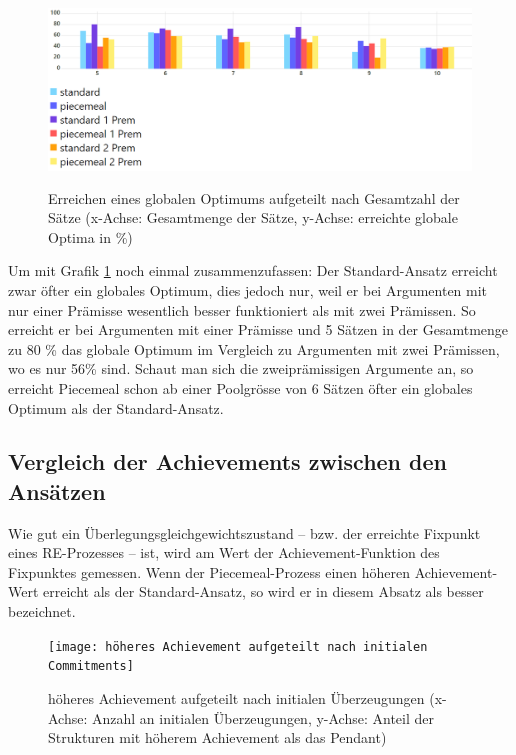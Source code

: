 \documentclass{article}
\begin{document}
\begin{figure}[ht]
  \centering
  \includegraphics[width=\textwidth,height=5cm,keepaspectratio]{erreichen eines Globalen Optimums aufgeteilt nach Poolsize}
  \caption{Erreichen eines globalen Optimums aufgeteilt nach Gesamtzahl der Sätze (x-Achse: Gesamtmenge der Sätze, y-Achse: erreichte globale Optima in \%) \label{fig:GlobOptPoolsize}}
\end{figure}

Um mit Grafik \ref{fig:GlobOptPoolsize} noch einmal zusammenzufassen: Der Standard-Ansatz erreicht zwar öfter ein globales Optimum, dies jedoch nur, weil er bei Argumenten mit nur einer Prämisse wesentlich besser funktioniert als mit zwei Prämissen. So erreicht er bei Argumenten mit einer Prämisse und 5 Sätzen in der Gesamtmenge zu 80 \% das globale Optimum im Vergleich zu Argumenten mit zwei Prämissen, wo es nur 56\% sind. Schaut man sich die zweiprämissigen Argumente an, so erreicht Piecemeal schon ab einer Poolgrösse von 6 Sätzen öfter ein globales Optimum als der Standard-Ansatz.

\subsection{Vergleich der Achievements zwischen den Ansätzen}

Wie gut ein Überlegungsgleichgewichtszustand -- bzw. der erreichte Fixpunkt eines RE-Prozesses -- ist, wird am Wert der Achievement-Funktion des Fixpunktes gemessen. Wenn der Piecemeal-Prozess einen höheren Achievement-Wert erreicht als der Standard-Ansatz, so wird er in diesem Absatz als besser bezeichnet.

\begin{figure}[ht]
  \centering
  \texttt{[image: höheres Achievement aufgeteilt nach initialen Commitments]}
  \caption{höheres Achievement aufgeteilt nach initialen Überzeugungen (x-Achse: Anzahl an initialen Überzeugungen, y-Achse: Anteil der Strukturen mit höherem Achievement als das Pendant) \label{fig:höheres Achievement aufgeteilt nach initialen Commitments}}
\end{figure}
\end{document}

